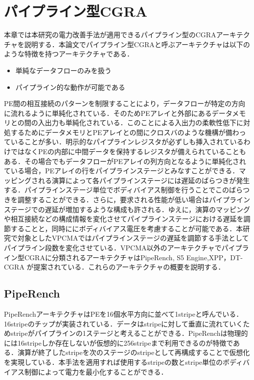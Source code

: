 \chapter{パイプライン型CGRA}
{
\label{chap:survey}

本章では本研究の電力改善手法が適用できるパイプライン型のCGRAアーキテクチャを説明する．本論文でパイプライン型CGRAと呼ぶアーキテクチャは以下のような特徴を持つアーキテクチャである．

\begin{itemize}
\item 単純なデータフローのみを扱う
\item パイプライン的な動作が可能である
\end{itemize}

PE間の相互接続のパターンを制限することにより，データフローが特定の方向に流れるように単純化されている．そのためPEアレイと外部にあるデータメモリとの間の入出力も単純化されている．このことによる入出力の柔軟性低下に対処するためにデータメモリとPEアレイとの間にクロスバのような機構が備わっていることが多い．明示的なパイプラインレジスタが必ずしも挿入されているわけではなくPEの内部に中間データを保持するレジスタが備えられていることもある．その場合でもデータフローがPEアレイの列方向となるように単純化されている場合，PEアレイの行をパイプラインステージとみなすことができる．マッピングされる演算によって各パイプラインステージには遅延のばらつきが発生する．パイプラインステージ単位でボディバイアス制御を行うことでこのばらつきを調整することができる．さらに，要求される性能が低い場合はパイプラインステージでの遅延が増加するような構成も許される．ゆえに，演算のマッピングや相互接続などの構成情報を変化させてパイプラインステージにおける遅延を調節することと，同時ににボディバイアス電圧を考慮することが可能である．本研究で対象としたVPCMAではパイプラインステージの遅延を調節する手法としてパイプライン段数を変化させている．VPCMA以外のアーキテクチャでパイプライン型CGRAに分類されるアーキテクチャはPipeRench\cite{piperench}, S5 Engine\cite{s5},XPP\cite{xpp}，DT-CGRA\cite{DT-CGRA}
が提案されている．これらのアーキテクチャの概要を説明する．

\section{PipeRench}
\label{sec:PipeRench}
PipeRenchアーキテクチャはPEを16個水平方向に並べて1stripeと呼んでいる．16stripeのチップが実装されている．データはstripeに対して垂直に流れていくためstripeがパイプラインの1ステージと考えることができる．PipeRenchは物理的には16stripeしか存在しないが仮想的に256stripeまで利用できるのが特徴である．演算が終了したstripeを次のステージのstripeとして再構成することで仮想化を実現している．本手法を適用すれば使用するstripeの数とstripe単位のボディバイアス制御によって電力を最小化することができる．


}
